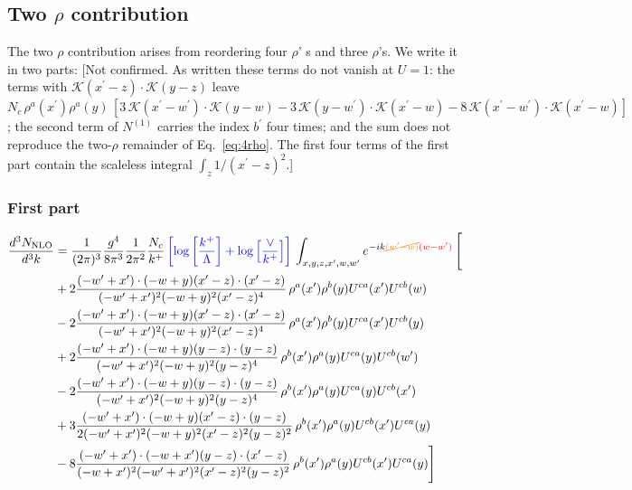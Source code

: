 \documentclass[aps,prd,amsmath,amssymb,nofootinbib]{revtex4-2}
\numberwithin{equation}{section}
\begin{document}
\subsection{Two $\rho$ contribution}
The two $\rho$ contribution arises from reordering four $\rho$' s and three $\rho$'s. We write it in two parts: {\color{red}[Not confirmed. As written these terms do not vanish at $U=1$: the terms with $\mathcal{K}(x^{\prime}-z)\cdot\mathcal{K}(y-z)$ leave $N_{c}\,\rho^{a}(x^{\prime})\rho^{a}(y)\,[3\,\mathcal{K}(x^{\prime}-w^{\prime})\cdot\mathcal{K}(y-w)-3\,\mathcal{K}(y-w^{\prime})\cdot\mathcal{K}(x^{\prime}-w)-8\,\mathcal{K}(x^{\prime}-w^{\prime})\cdot\mathcal{K}(x^{\prime}-w)]$; the second term of $N^{(1)}$ carries the index $b^{\prime}$ four times; and the sum does not reproduce the two-$\rho$ remainder of Eq.~\eqref{eq:4rho}. The first four terms of the first part contain the scaleless integral $\int_{z}1/(x^{\prime}-z)^{2}$.]}
\subsubsection{First part}
\begin{align}
    \frac{d^{3}N_{\rm NLO}}{d^{3}k} & = \frac{1}{(2\pi)^{3}}\frac{g^{4}}{8\pi^{3}}\frac{1}{2\pi^{2}} \frac{N_{c}}{k^{+}}\,{\color{blue}\left[\log{\left[\frac{k^{+}}{\Lambda}\right]}+\log{\left[\frac{\vee}{k^{+}}\right]}\right]}\,\int_{x,y,z,x^{\prime},w,w^{\prime}}e^{-ik{\color{orange}\cancel{(w^{\prime}-w)}}{\color{red}(w-w^{\prime})}}\, \Bigg[\notag \\ &  + 2 \frac{( - w' + x') \cdot ( - w + y) (x' - z) \cdot (x' - z)}{( - w' + x')^{2} ( - w + y)^{2} (x' - z)^{4}}\,\rho^{a}(x') \rho^{b}(y) U^{c a}(x') U^{c b}(w)\nonumber\\
    &- 2 \frac{( - w' + x') \cdot ( - w + y) (x' - z) \cdot (x' - z)}{( - w' + x')^{2} ( - w + y)^{2} (x' - z)^{4}}\,\rho^{a}(x') \rho^{b}(y) U^{c a}(x') U^{c b}(y)\nonumber\\
        &+ 2 \frac{( - w' + x') \cdot ( - w + y) (y - z) \cdot (y - z)}{( - w' + x')^{2} ( - w + y)^{2} (y - z)^{4}}\,\rho^{b}(x') \rho^{a}(y) U^{c a}(y) U^{c b}(w')\nonumber\\
    &-2\frac{( - w' + x') \cdot ( - w + y) (y - z) \cdot (y - z)}{( - w' + x')^{2} ( - w + y)^{2} (y - z)^{4}}\,\rho^{b}(x') \rho^{a}(y) U^{c a}(y) U^{c b}(x')\nonumber\\
    &+ 3 \frac{( - w' + x') \cdot ( - w + y) (x' - z) \cdot (y - z)}{2 ( - w' + x')^{2} ( - w + y)^{2} (x' - z)^{2} (y - z)^{2}}\,\rho^{b}(x') \rho^{a}(y) U^{cb}(x') U^{ca}(y) \nonumber\\
    &- 8 \frac{( - w' + x') \cdot ( - w + x') (y - z) \cdot (x' - z)}{( - w + x')^{2} ( - w' + x')^{2} (x' - z)^{2} (y - z)^{2}}\,\rho^{b}(x') \rho^{a}(y) U^{cb}(x') U^{c a}(y) \Bigg]
\end{align}
\end{document}
